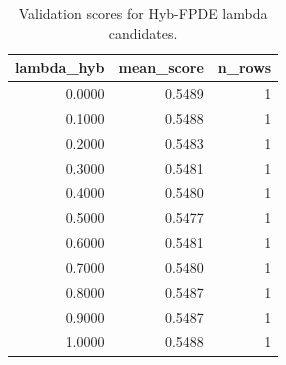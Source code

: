 \begin{table}[t]
\caption{Validation scores for Hyb-FPDE lambda candidates.}
\label{tab:lambda_distribution_computed}
\centering
\begin{tabular}{rrr}
\toprule
lambda\_hyb & mean\_score & n\_rows \\
\midrule
0.0000 & 0.5489 & 1 \\
0.1000 & 0.5488 & 1 \\
0.2000 & 0.5483 & 1 \\
0.3000 & 0.5481 & 1 \\
0.4000 & 0.5480 & 1 \\
0.5000 & 0.5477 & 1 \\
0.6000 & 0.5481 & 1 \\
0.7000 & 0.5480 & 1 \\
0.8000 & 0.5487 & 1 \\
0.9000 & 0.5487 & 1 \\
1.0000 & 0.5488 & 1 \\
\bottomrule
\end{tabular}

\end{table}
